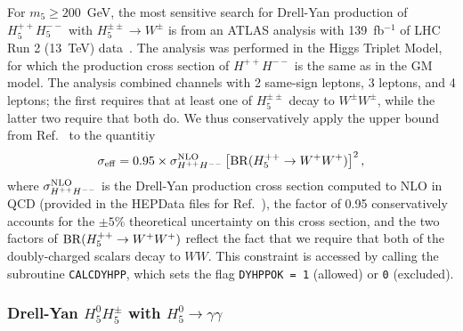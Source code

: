 \documentclass[11pt]{article}
\begin{document}
For $m_5 \geq 200$~GeV, the most sensitive search for Drell-Yan production of $H_5^{++}H_5^{--}$ with $H_5^{\pm\pm} \to W^{\pm}$ is from an ATLAS analysis with 139~fb$^{-1}$ of LHC Run 2 (13~TeV) data~\cite{ATLAS:2021jol}.  The analysis was performed in the Higgs Triplet Model, for which the production cross section of $H^{++}H^{--}$ is the same as in the GM model.  The analysis combined channels with 2 same-sign leptons, 3 leptons, and 4 leptons; the first requires that at least one of $H_5^{\pm\pm}$ decay to $W^{\pm}W^{\pm}$, while the latter two require that both do.  We thus conservatively apply the upper bound from Ref.~\cite{ATLAS:2021jol} to the quantitiy
\begin{equation}
	\sigma_{\rm eff} = 0.95 \times \sigma^{\rm NLO}_{H^{++}H^{--}} 
		\left[ {\rm BR}(H_5^{++} \to W^+W^+) \right]^2,
\end{equation}
where $\sigma^{\rm NLO}_{H^{++}H^{--}}$ is the Drell-Yan production cross section computed to NLO in QCD (provided in the HEPData files for Ref.~\cite{ATLAS:2021jol}), the factor of 0.95 conservatively accounts for the $\pm 5\%$ theoretical uncertainty on this cross section, and the two factors of ${\rm BR}(H_5^{++} \to W^+W^+)$ reflect the fact that we require that both of the doubly-charged scalars decay to $WW$.  This constraint is accessed by calling the subroutine {\tt CALCDYHPP}, which sets the flag {\tt DYHPPOK = 1} (allowed) or {\tt 0} (excluded).

\subsubsection{Drell-Yan $H_5^0 H_5^{\pm}$ with $H_5^0 \to \gamma\gamma$}
\end{document}
